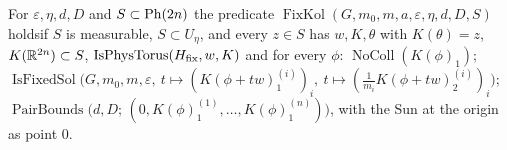 \begin{definition}\label{bpP:p0:fixkol}
For $\varepsilon,\eta,d,D$ and $S\subset\mathrm{Ph}(2n)$ the predicate $\operatorname{FixKol}(G,m_0,m,a,\varepsilon,\eta,d,D,S)$ holds\linebreak if $S$ is measurable, $S\subset U_\eta$, and
every $z\in S$ has $w,K,\theta$ with $K(\theta)=z$, $K(\mathbb{R}^{2n})\subset S$, $\operatorname{IsPhysTorus}(H_{\rm fix},w,K)$ and for every $\phi$:
$\operatorname{NoColl}(K(\phi)_1)$; $\operatorname{IsFixedSol}\bigl(G,m_0,m,\varepsilon,\ t\mapsto(K(\phi+tw)_1^{(i)})_i,\ t\mapsto(\tfrac1{m_i}K(\phi+tw)_2^{(i)})_i\bigr)$;
$\operatorname{PairBounds}\bigl(d,D;\,(0,K(\phi)_1^{(1)},\dots,K(\phi)_1^{(n)})\bigr)$, with the Sun at the origin as point $0$.
\end{definition}

